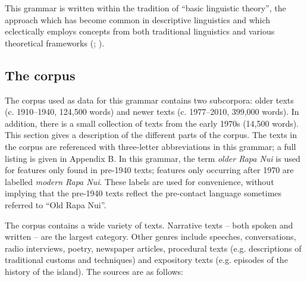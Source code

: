 This grammar is written within the tradition of “basic linguistic theory”, the approach which has become common in descriptive linguistics and which eclectically employs concepts from both traditional linguistics and various theoretical frameworks (\citealt{Dryer2001,Dryer2006}; \citealt{Dixon2010-1,Dixon2010-2,Dixon2012}). 

\subsection{The corpus}\label{sec:1.6.2}

The corpus used as data for this grammar contains two subcorpora: older texts (c. 1910–1940, 124,500 words) and newer texts (c. 1977–2010, 399,000 words). In addition, there is a small collection of texts from the early 1970s (14,500 words). This section gives a description of the different parts of the corpus. The texts in the corpus are referenced with three-letter abbreviations in this grammar; a full listing is given in Appendix B. In this grammar, the term \textit{older Rapa Nui} is used for features only found in pre-1940 texts; features only occurring after 1970 are labelled \textit{modern Rapa Nui}. These labels are used for convenience, without implying that the pre-1940 texts reflect the pre-contact language sometimes referred to “Old Rapa Nui”.

The corpus contains a wide variety of texts. Narrative texts – both spoken and written – are the largest category. Other genres include speeches, conversations, radio interviews, poetry, newspaper articles, procedural texts (e.g. descriptions of traditional customs and techniques) and expository texts (e.g. episodes of the history of the island). The sources are as follows:

